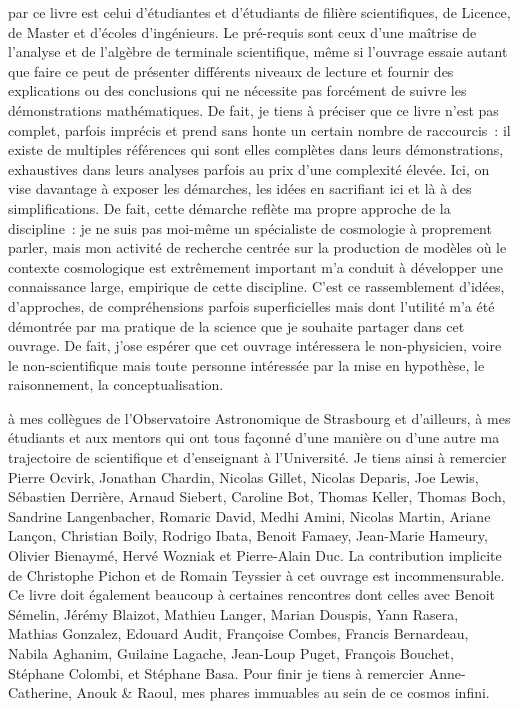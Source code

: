  par ce livre est celui d'étudiantes et d'étudiants de filière scientifiques, de Licence, de Master et d'écoles d'ingénieurs. Le pré-requis sont ceux d'une maîtrise de l'analyse et de l'algèbre de terminale scientifique, même si l'ouvrage essaie autant que faire ce peut de présenter différents niveaux de lecture et fournir des explications ou des conclusions qui ne nécessite pas forcément de suivre les démonstrations mathématiques. De fait, je tiens à préciser que ce livre n'est pas complet, parfois imprécis et prend sans honte un certain nombre de raccourcis~: il existe de multiples références qui sont elles complètes dans leurs démonstrations, exhaustives dans leurs analyses parfois au prix d'une complexité élevée. Ici, on vise davantage à exposer les démarches, les idées en sacrifiant ici et là à des simplifications. De fait, cette démarche reflète ma propre approche de la discipline~: je ne suis pas moi-même un spécialiste de cosmologie à proprement parler, mais mon activité de recherche centrée sur la production de modèles où le contexte cosmologique est extrêmement important m'a conduit à développer une connaissance large, empirique de cette discipline. C'est ce rassemblement d'idées, d'approches, de compréhensions parfois superficielles mais dont l'utilité m'a été démontrée par ma pratique de la science que je souhaite partager dans cet ouvrage. De fait, j'ose espérer que cet ouvrage intéressera le non-physicien, voire le non-scientifique mais toute personne intéressée par la mise en hypothèse, le raisonnement, la conceptualisation.

 à mes collègues de l'Observatoire Astronomique de Strasbourg et d'ailleurs, à mes étudiants et aux mentors qui ont tous façonné d'une manière ou d'une autre ma trajectoire de scientifique et d'enseignant à l'Université. Je tiens ainsi à remercier Pierre Ocvirk, Jonathan Chardin, Nicolas Gillet, Nicolas Deparis, Joe Lewis, Sébastien Derrière, Arnaud Siebert, Caroline Bot, Thomas Keller, Thomas Boch, Sandrine Langenbacher, Romaric David, Medhi Amini, Nicolas Martin, Ariane Lançon, Christian Boily, Rodrigo Ibata, Benoit Famaey, Jean-Marie Hameury, Olivier Bienaymé, Hervé Wozniak et Pierre-Alain Duc. La contribution implicite de Christophe Pichon et de Romain Teyssier à cet ouvrage est incommensurable. Ce livre doit également beaucoup à certaines rencontres dont celles avec Benoit Sémelin, Jérémy Blaizot, Mathieu Langer, Marian Douspis, Yann Rasera, Mathias Gonzalez, Edouard Audit, Françoise Combes, Francis Bernardeau, Nabila Aghanim, Guilaine Lagache, Jean-Loup Puget, François Bouchet, Stéphane Colombi, et Stéphane Basa. Pour finir je tiens à remercier Anne-Catherine, Anouk \& Raoul, mes phares immuables au sein de ce cosmos infini.